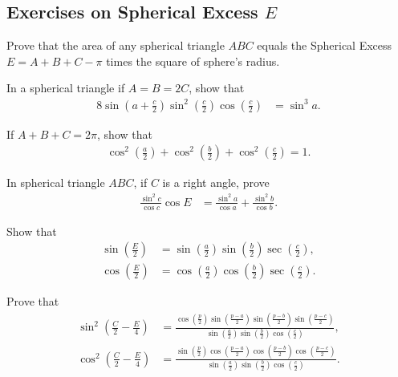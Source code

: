 \documentclass[12pt,a4paper]{memoir}
\theoremstyle{definition}
\begin{document}
\subsection{Exercises on Spherical Excess $E$}

	\begin{question}
		Prove that the area of any spherical triangle $ABC$ equals the Spherical Excess $E=A+B+C-\pi$ times the square of sphere's radius.
	\end{question}
	
	\begin{question}%
		In a spherical triangle if $A=B=2C$, show that
		\begin{align*}
			8\sin\left(a+\frac{c}{2}\right)\sin^2\left(\frac{c}{2}\right)\cos\left(\frac{c}{2}\right) &= \sin^3 a.
		\end{align*}
	\end{question}
	
	\begin{question}%
		If $A+B+C=2\pi$, show that
		\begin{align*}
			\cos^2\left(\frac{a}{2}\right)+\cos^2\left(\frac{b}{2}\right)+\cos^2\left(\frac{c}{2}\right)=1.
		\end{align*}
	\end{question}
	
	\begin{question}
		In spherical triangle $ABC$, if $C$ is a right angle, prove
		\begin{align*}
			\frac{\sin^2 c}{\cos c} \cos E &= \frac{\sin^2 a}{\cos a}+\frac{\sin^2 b}{\cos b}.
		\end{align*}
	\end{question}
	
	\begin{question}
		Show that
		\begin{align*}
			\sin\left(\frac{E}{2}\right) &= \sin\left(\frac{a}{2}\right)\sin\left(\frac{b}{2}\right) \sec\left(\frac{c}{2}\right),\\
			\cos\left(\frac{E}{2}\right) &= \cos\left(\frac{a}{2}\right)\cos\left(\frac{b}{2}\right) \sec\left(\frac{c}{2}\right).
		\end{align*}
	\end{question}
	
	
	\begin{question}
		Prove that
		\begin{align*}
			\sin^2\left(\frac{C}{2}-\frac{E}{4}\right) &= \frac{\displaystyle \cos\left(\frac{p}{2}\right)\sin\left(\frac{p-a}{2}\right)\sin\left(\frac{p-b}{2}\right)\sin\left(\frac{p-c}{2}\right)}{\displaystyle \sin\left(\frac{a}{2}\right)\sin\left(\frac{b}{2}\right)\cos\left(\frac{c}{2}\right)},\\
			\cos^2\left(\frac{C}{2}-\frac{E}{4}\right) &= \frac{\displaystyle \sin\left(\frac{p}{2}\right)\cos\left(\frac{p-a}{2}\right)\cos\left(\frac{p-b}{2}\right)\cos\left(\frac{p-c}{2}\right)}{\displaystyle \sin\left(\frac{a}{2}\right)\sin\left(\frac{b}{2}\right)\cos\left(\frac{c}{2}\right)}.
		\end{align*}
	\end{question}
	
\end{document}
